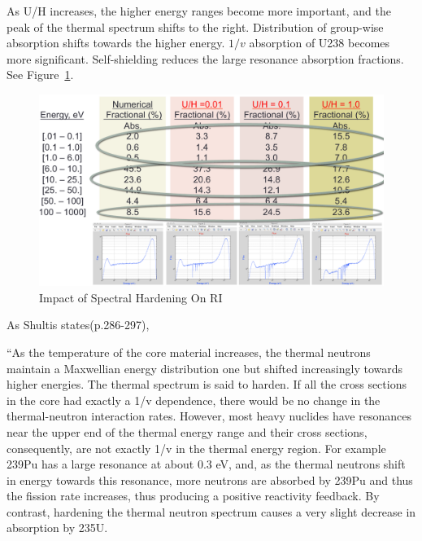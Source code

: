 \documentclass{school-22.211-notes}
\begin{document}
\clearpage
\label{spectral-hardening-section}
As U/H increases, the higher energy ranges become more important, and the peak of the thermal spectrum shifts to the right. Distribution of group-wise absorption shifts towards the higher energy. $1/v$ absorption of U238 becomes more significant. Self-shielding reduces the large resonance absorption fractions. See Figure~\ref{spectral-hardening}. 
\begin{figure}[ht]
  \centering
  \includegraphics[width=6in]{images/r-m/spectral-hardening.png}
  \caption{Impact of Spectral Hardening On RI} \label{spectral-hardening}
\end{figure}

As Shultis states(p.286-297),

``As the temperature of the core material increases, the thermal neutrons maintain a Maxwellian energy distribution one but shifted increasingly towards higher energies. The thermal spectrum is said to harden. If all the cross sections in the core
had exactly a 1/v dependence, there would be no change in the thermal-neutron
interaction rates. However, most heavy nuclides have resonances near the upper end
of the thermal energy range and their cross sections, consequently, are not exactly
1/v in the thermal energy region. For example 239Pu has a large resonance at about 0.3 eV, and, as the thermal neutrons shift in energy towards this resonance, more neutrons are absorbed by 239Pu and thus the fission rate increases, thus producing a positive reactivity feedback. By contrast, hardening the thermal neutron spectrum causes a very slight decrease in absorption by 235U. 
\end{document}
